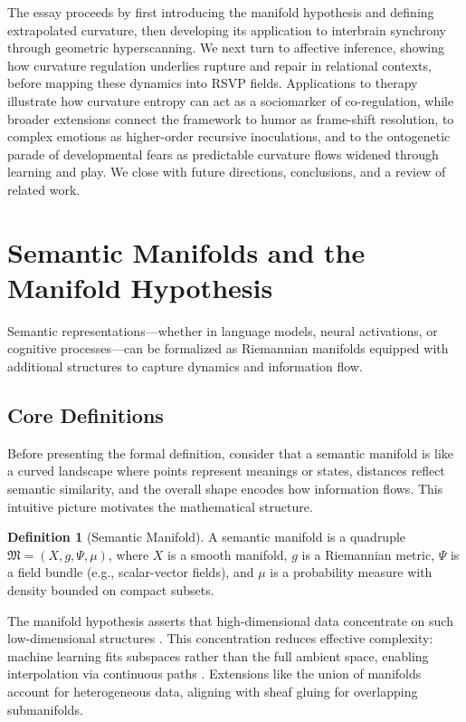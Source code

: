\documentclass{article}
\theoremstyle{definition}
\newtheorem{definition}{Definition}[section]
\begin{document}
The essay proceeds by first introducing the manifold hypothesis and defining extrapolated curvature, then developing its application to interbrain synchrony through geometric hyperscanning. We next turn to affective inference, showing how curvature regulation underlies rupture and repair in relational contexts, before mapping these dynamics into RSVP fields. Applications to therapy illustrate how curvature entropy can act as a sociomarker of co-regulation, while broader extensions connect the framework to humor as frame-shift resolution, to complex emotions as higher-order recursive inoculations, and to the ontogenetic parade of developmental fears as predictable curvature flows widened through learning and play. We close with future directions, conclusions, and a review of related work.

\section{Semantic Manifolds and the Manifold Hypothesis}

Semantic representations—whether in language models, neural activations, or cognitive processes—can be formalized as Riemannian manifolds equipped with additional structures to capture dynamics and information flow.

\subsection{Core Definitions}

Before presenting the formal definition, consider that a semantic manifold is
like a curved landscape where points represent meanings or states, distances
reflect semantic similarity, and the overall shape encodes how information
flows. This intuitive picture motivates the mathematical structure.

\begin{definition}[Semantic Manifold]
A semantic manifold is a quadruple $\mathfrak{M} = (X, g, \Psi, \mu)$, where $X$ is a smooth manifold, $g$ is a Riemannian metric, $\Psi$ is a field bundle (e.g., scalar-vector fields), and $\mu$ is a probability measure with density bounded on compact subsets.
\end{definition}

The manifold hypothesis asserts that high-dimensional data concentrate on such low-dimensional structures \cite{fefferman2016testing,gorban2018blessing}. This concentration reduces effective complexity: machine learning fits subspaces rather than the full ambient space, enabling interpolation via continuous paths \cite{chollet2021deep}. Extensions like the union of manifolds \cite{brown2023union} account for heterogeneous data, aligning with sheaf gluing for overlapping submanifolds.
\end{document}
